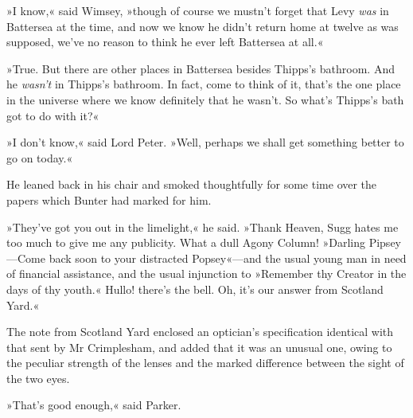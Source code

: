 »I know,« said Wimsey, »though of course we mustn't forget that Levy \textit{was} in Battersea at the time, and now we know he didn't return home at twelve as was supposed, we've no reason to think he ever left Battersea at all.«

»True. But there are other places in Battersea besides Thipps's bathroom. And he \textit{wasn't} in Thipps's bathroom. In fact, come to think of it, that's the one place in the universe where we know definitely that he wasn't. So what's Thipps's bath got to do with it?«

»I don't know,« said Lord Peter. »Well, perhaps we shall get something better to go on today.«

He leaned back in his chair and smoked thoughtfully for some time over the papers which Bunter had marked for him.

»They've got you out in the limelight,« he said. »Thank Heaven, Sugg hates me too much to give me any publicity. What a dull Agony Column! »Darling Pipsey—Come back soon to your distracted Popsey«---and the usual young man in need of financial assistance, and the usual injunction to »Remember thy Creator in the days of thy youth.« Hullo! there's the bell. Oh, it's our answer from Scotland Yard.«

The note from Scotland Yard enclosed an optician's specification identical with that sent by Mr Crimplesham, and added that it was an unusual one, owing to the peculiar strength of the lenses and the marked difference between the sight of the two eyes.

»That's good enough,« said Parker.

